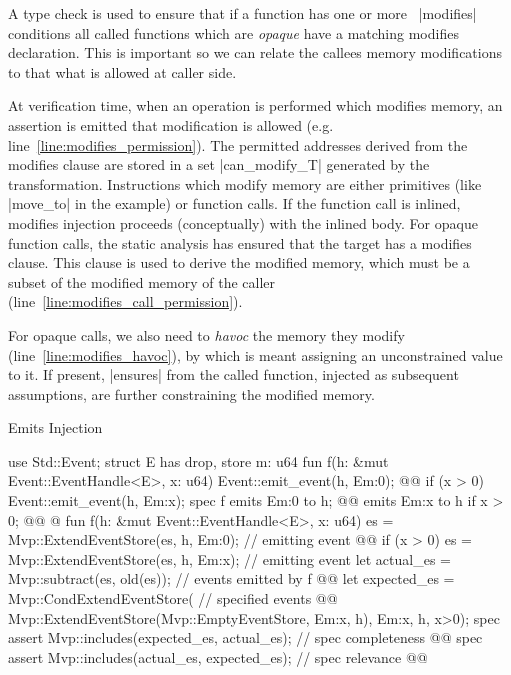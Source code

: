 A type check is used to ensure that if a function has one or more~%
|modifies| conditions all called functions which are \emph{opaque} have a matching
modifies declaration. This is important so we can relate the callees
memory modifications to that what is allowed at caller side.

At verification time, when an operation is performed which modifies memory, an
assertion is emitted that modification is allowed
(e.g. line~\ref{line:modifies_permission}). The permitted addresses derived from
the modifies clause are stored in a set |can_modify_T| generated by the
transformation. Instructions which modify memory are either primitives (like
|move_to| in the example) or function calls. If the function call is inlined,
modifies injection proceeds (conceptually) with the inlined body. For opaque
function calls, the static analysis has ensured that the target has a modifies
clause.  This clause is used to derive the modified memory, which must be a
subset of the modified memory of the caller
(line~\ref{line:modifies_call_permission}).

For opaque calls, we also need to \emph{havoc} the memory they modify
(line~\ref{line:modifies_havoc}), by which is meant assigning an unconstrained
value to it. If present, |ensures| from the called function, injected as
subsequent assumptions, are further constraining the modified memory.



\begin{Figure}
  \caption{Emits Injection}
  \label{fig:Emits}
  \centering
\begin{MoveBoxNumbered}
  use Std::Event;
  struct E has drop, store { m: u64 }
  fun f(h: &mut Event::EventHandle<E>, x: u64) {
    Event::emit_event(h, E{m:0}); @\label{line:emit_event}@
    if (x > 0) {
      Event::emit_event(h, E{m:x});
    }
  }
  spec f {
    emits E{m:0} to h; @\label{line:emits}@
    emits E{m:x} to h if x > 0; @\label{line:emits_if}@
  }
  @\transform@
  fun f(h: &mut Event::EventHandle<E>, x: u64) {
    es = Mvp::ExtendEventStore(es, h, E{m:0}); // emitting event @\label{line:extend_es}@
    if (x > 0) {
      es = Mvp::ExtendEventStore(es, h, E{m:x}); // emitting event
    }
    let actual_es = Mvp::subtract(es, old(es)); // events emitted by f @\label{line:actual_es}@
    let expected_es = Mvp::CondExtendEventStore( // specified events @\label{line:expected_es}@
      Mvp::ExtendEventStore(Mvp::EmptyEventStore, E{m:x}, h),
      E{m:x}, h, x>0);
    spec assert Mvp::includes(expected_es, actual_es); // spec completeness @\label{line:emits_completeness}@
    spec assert Mvp::includes(actual_es, expected_es); // spec relevance @\label{line:emits_relevance}@
  }
\end{MoveBoxNumbered}
\end{Figure}

